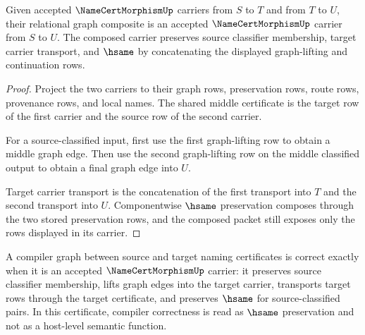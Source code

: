 \begin{theorem}
\label{thm:namecert-morphism-composition-obligation}
Given accepted $\NameCertMorphismUp$ carriers from $S$ to $T$ and from $T$ to $U$, their relational graph composite is an accepted $\NameCertMorphismUp$ carrier from $S$ to $U$. The composed carrier preserves source classifier membership, target carrier transport, and $\hsame$ by concatenating the displayed graph-lifting and continuation rows.
\end{theorem}

\begin{proof}
Project the two carriers to their graph rows, preservation rows, route rows, provenance rows, and local names. The shared middle certificate is the target row of the first carrier and the source row of the second carrier.

For a source-classified input, first use the first graph-lifting row to obtain a middle graph edge. Then use the second graph-lifting row on the middle classified output to obtain a final graph edge into $U$.

Target carrier transport is the concatenation of the first transport into $T$ and the second transport into $U$. Componentwise $\hsame$ preservation composes through the two stored preservation rows, and the composed packet still exposes only the rows displayed in its carrier.
\end{proof}

\begin{theorem}
\label{thm:namecert-morphism-compiler-correctness-bridge}
A compiler graph between source and target naming certificates is correct exactly when it is an accepted $\NameCertMorphismUp$ carrier: it preserves source classifier membership, lifts graph edges into the target carrier, transports target rows through the target certificate, and preserves $\hsame$ for source-classified pairs. In this certificate, compiler correctness is read as $\hsame$ preservation and not as a host-level semantic function.
\end{theorem}

